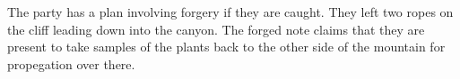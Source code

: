 The party has a plan involving forgery if they are caught.
They left two ropes on the cliff leading down into the canyon.
The forged note claims that they are present to take samples of the plants back to the other side of the mountain for propegation over there.
